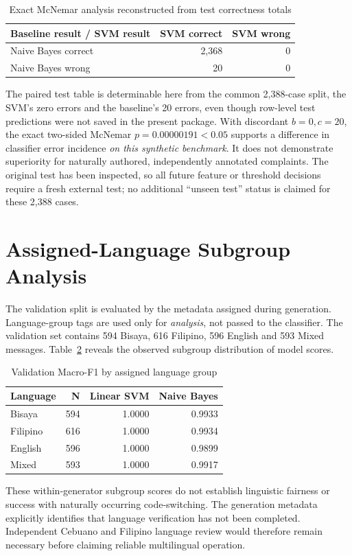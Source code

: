 \begin{table}[H]\centering\caption{Exact McNemar analysis reconstructed from test correctness totals}\label{tab:m2mcnemar}\small\begin{tabular}{lrr}\toprule
Baseline result / SVM result & SVM correct & SVM wrong\\\midrule
Naive Bayes correct & 2,368 & 0\\
Naive Bayes wrong & 20 & 0\\\bottomrule
\end{tabular}\end{table}
The paired test table is determinable here from the common 2,388-case split, the SVM's zero errors and the baseline's 20 errors, even though row-level test predictions were not saved in the present package. With discordant $b=0,c=20$, the exact two-sided McNemar $p=0.00000191 <0.05$ supports a difference in classifier error incidence \emph{on this synthetic benchmark}. It does not demonstrate superiority for naturally authored, independently annotated complaints. The original test has been inspected, so all future feature or threshold decisions require a fresh external test; no additional ``unseen test'' status is claimed for these 2,388 cases.

\section{Assigned-Language Subgroup Analysis}
The validation split is evaluated by the metadata assigned during generation. Language-group tags are used only for \emph{analysis}, not passed to the classifier. The validation set contains 594 Bisaya, 616 Filipino, 596 English and 593 Mixed messages. Table~\ref{tab:languages} reveals the observed subgroup distribution of model scores.
\begin{table}[H]\centering\caption{Validation Macro-F1 by assigned language group}\label{tab:languages}\small\begin{tabular}{lrrr}\toprule
Language & N & Linear SVM & Naive Bayes\\\midrule
Bisaya & 594 & 1.0000 & 0.9933\\
Filipino & 616 & 1.0000 & 0.9934\\
English & 596 & 1.0000 & 0.9899\\
Mixed & 593 & 1.0000 & 0.9917\\\bottomrule
\end{tabular}\end{table}
These within-generator subgroup scores do not establish linguistic fairness or success with naturally occurring code-switching. The generation metadata explicitly identifies that language verification has not been completed. Independent Cebuano and Filipino language review would therefore remain necessary before claiming reliable multilingual operation.

